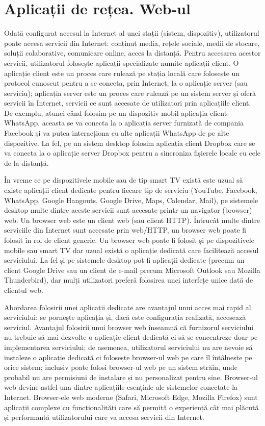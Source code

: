 \section{Aplicații de rețea. Web-ul}
\label{sec:net:apps}

Odată configurat accesul la Internet al unei stații (sistem, dispozitiv), utilizatorul poate accesa servicii din Internet: conținut media, rețele sociale, medii de stocare, soluții colaborative, comunicare online, acces la distanță. Pentru accesarea acestor servicii, utilizatorul folosește aplicații specializate numite aplicații client. O aplicație client este un proces care rulează pe stația locală care folosește un protocol cunoscut pentru a se conecta, prin Internet, la o aplicație server (sau serviciu); aplicația server este un proces care rulează pe un sistem server și oferă servicii în Internet, servicii ce sunt accesate de utilizatori prin aplicațiile client. De exemplu, atunci când folosim pe un dispozitiv mobil aplicația client WhatsApp, aceasta se va conecta la o aplicația server furnizată de compania Facebook și va putea interacționa cu alte aplicații WhatsApp de pe alte dispozitive. La fel, pe un sistem desktop folosim aplicația client Dropbox care se va conecta la o aplicație server Dropbox pentru a sincroniza fișierele locale cu cele de la distanță.

În vreme ce pe dispozitivele mobile sau de tip smart TV există este uzual să existe aplicații client dedicate pentru fiecare tip de serviciu (YouTube, Facebook, WhatsApp, Google Hangouts, Google Drive, Maps, Calendar, Mail), pe sistemele desktop multe dintre aceste servicii sunt accesate printr-un navigator (browser) web. Un browser web este un client web (sau client HTTP). Întrucât multe dintre serviciile din Internet sunt accesate prin web/HTTP, un browser web poate fi folosit în rol de client generic. Un browser web poate fi folosit și pe dispozitivele mobile sau smart TV dar uzual există o aplicație dedicată care facilitează accesul serviciului. La fel și pe sistemele desktop pot fi aplicații dedicate (precum un client Google Drive sau un client de e-mail precum Microsoft Outlook sau Mozilla Thunderbird), dar mulți utilizatori preferă folosirea unei interfețe unice dată de clientul web.

Abordarea folosirii unei aplicații dedicate are avantajul unui acces mai rapid al serviciului: se pornește aplicația și, dacă este configurația realizată, accesează serviciul. Avantajul folosirii unui browser web înseamnă că furnizorul serviciului nu trebuie să mai dezvolte o aplicație client dedicată ci să se concentreze doar pe implementarea serviciului; de asemenea, utilizatorul serviciului nu are nevoie să instaleze o aplicație dedicată ci folosește browser-ul web pe care îl întâlnește pe orice sistem; inclusiv poate folosi browser-ul web pe un sistem străin, unde probabil nu are permisiuni de instalare și nu personalizat pentru sine. Browser-ul web devine astfel una dintre aplicațiile esențiale ale sistemelor conectate la Internet. Browser-ele web moderne (Safari, Microsoft Edge, Mozilla Firefox) sunt aplicații complexe cu funcționalități care să permită o experiență cât mai plăcută și performantă utilizatorului care va accesa servicii din Internet.

